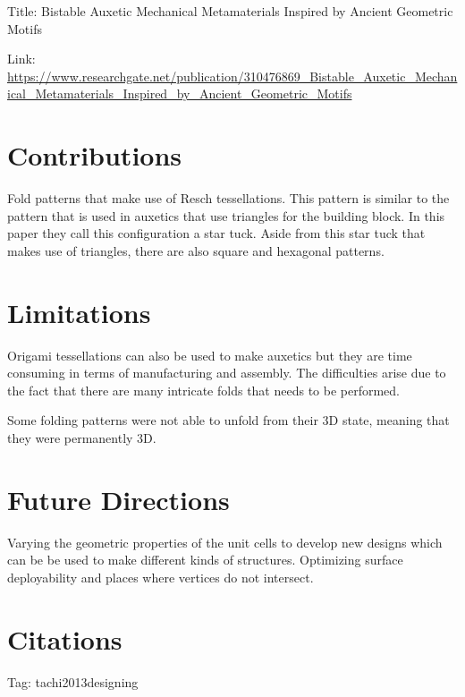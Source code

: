 \documentclass{article}
\begin{document}
    
Title: Bistable Auxetic Mechanical Metamaterials Inspired by Ancient Geometric Motifs

Link: \url{https://www.researchgate.net/publication/310476869_Bistable_Auxetic_Mechanical_Metamaterials_Inspired_by_Ancient_Geometric_Motifs}

\section*{Contributions}
Fold patterns that make use of Resch tessellations. This pattern is similar to the pattern
that is used in auxetics that use triangles for the building block. In this paper 
\cite{tachi2013designing} they call this configuration a star tuck. Aside from this star
tuck that makes use of triangles, there are also square and hexagonal patterns. 



\section*{Limitations}
Origami tessellations can also be used to make auxetics but they are time consuming in 
terms of manufacturing and assembly. The difficulties arise due to the fact that there 
are many intricate folds that needs to be performed. 

Some folding patterns were not able to unfold from their 3D state, meaning that they were
permanently 3D. 

\section*{Future Directions}
Varying the geometric properties of the unit cells to develop new designs which can be
be used to make different kinds of structures. Optimizing surface deployability and places
where vertices do not intersect. 



\section*{Citations}


Tag: tachi2013designing
\cite{tachi2013designing}
\end{document}
